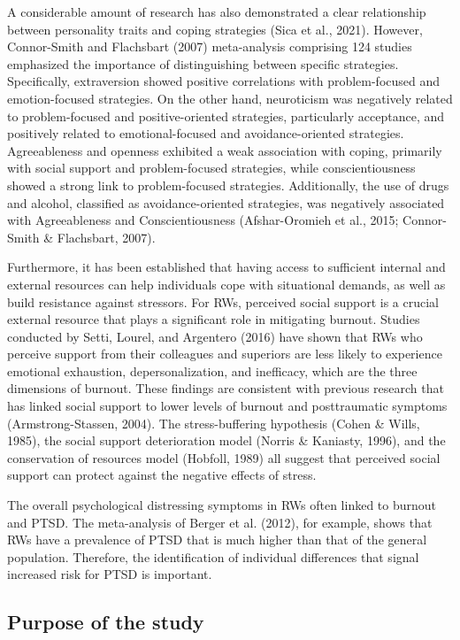 \documentclass[
  man]{apa6}
\begin{document}
A considerable amount of research has also demonstrated a clear relationship between personality traits and coping strategies (Sica et al., 2021). However, Connor-Smith and Flachsbart (2007) meta-analysis comprising 124 studies emphasized the importance of distinguishing between specific strategies. Specifically, extraversion showed positive correlations with problem-focused and emotion-focused strategies. On the other hand, neuroticism was negatively related to problem-focused and positive-oriented strategies, particularly acceptance, and positively related to emotional-focused and avoidance-oriented strategies. Agreeableness and openness exhibited a weak association with coping, primarily with social support and problem-focused strategies, while conscientiousness showed a strong link to problem-focused strategies. Additionally, the use of drugs and alcohol, classified as avoidance-oriented strategies, was negatively associated with Agreeableness and Conscientiousness (Afshar-Oromieh et al., 2015; Connor-Smith \& Flachsbart, 2007).

Furthermore, it has been established that having access to sufficient internal and external resources can help individuals cope with situational demands, as well as build resistance against stressors. For RWs, perceived social support is a crucial external resource that plays a significant role in mitigating burnout. Studies conducted by Setti, Lourel, and Argentero (2016) have shown that RWs who perceive support from their colleagues and superiors are less likely to experience emotional exhaustion, depersonalization, and inefficacy, which are the three dimensions of burnout. These findings are consistent with previous research that has linked social support to lower levels of burnout and posttraumatic symptoms (Armstrong-Stassen, 2004). The stress-buffering hypothesis (Cohen \& Wills, 1985), the social support deterioration model (Norris \& Kaniasty, 1996), and the conservation of resources model (Hobfoll, 1989) all suggest that perceived social support can protect against the negative effects of stress.

The overall psychological distressing symptoms in RWs often linked to burnout and PTSD. The meta-analysis of Berger et al. (2012), for example, shows that RWs have a prevalence of PTSD that is much higher than that of the general population. Therefore, the identification of individual differences that signal increased risk for PTSD is important.

\hypertarget{purpose-of-the-study}{%
\subsection{Purpose of the study}\label{purpose-of-the-study}}
\end{document}

